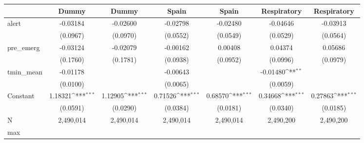 {
\def\sym#1{\ifmmode^{#1}\else\(^{#1}\)\fi}
\begin{tabular}{l*{6}{c}}
\toprule
            &\multicolumn{1}{c}{Dummy}&\multicolumn{1}{c}{Dummy}&\multicolumn{1}{c}{Spain}&\multicolumn{1}{c}{Spain}&\multicolumn{1}{c}{Respiratory}&\multicolumn{1}{c}{Respiratory}\\
\midrule
alert       &    -0.03184         &    -0.02600         &    -0.02798         &    -0.02480         &    -0.04646         &    -0.03913         \\
            &    (0.0967)         &    (0.0970)         &    (0.0552)         &    (0.0549)         &    (0.0529)         &    (0.0564)         \\
pre\_emerg   &    -0.03124         &    -0.02079         &    -0.00162         &     0.00408         &     0.04374         &     0.05686         \\
            &    (0.1760)         &    (0.1781)         &    (0.0938)         &    (0.0952)         &    (0.0996)         &    (0.0979)         \\
tmin\_mean   &    -0.01178         &                     &    -0.00643         &                     &    -0.01480\sym{**} &                     \\
            &    (0.0100)         &                     &    (0.0065)         &                     &    (0.0059)         &                     \\
Constant    &     1.18321\sym{***}&     1.12905\sym{***}&     0.71526\sym{***}&     0.68570\sym{***}&     0.34668\sym{***}&     0.27863\sym{***}\\
            &    (0.0591)         &    (0.0290)         &    (0.0384)         &    (0.0181)         &    (0.0340)         &    (0.0185)         \\
\midrule
N           &   2,490,014         &   2,490,014         &   2,490,014         &   2,490,014         &   2,490,200         &   2,490,200         \\
max         &                     &                     &                     &                     &                     &                     \\
\bottomrule
\end{tabular}
}
